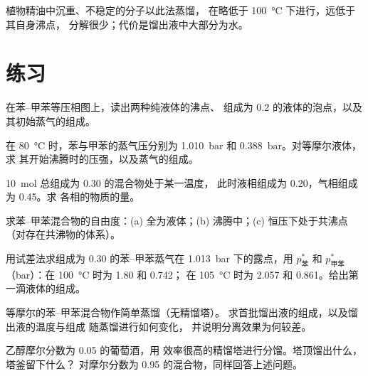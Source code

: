 植物精油中沉重、不稳定的分子以此法蒸馏，
在略低于 \qty{100}{\degreeCelsius} 下进行，远低于其自身沸点，
分解很少；代价是馏出液中大部分为水。

\section{练习}

\begin{exercise}[$\star$]\label{exo:b2:liquid-vapour-diagrams:1}
在苯–甲苯等压相图上，读出两种纯液体的沸点、
组成为 0.2 的液体的泡点，以及
其初始蒸气的组成。
\end{exercise}

\begin{exercise}[$\star$]\label{exo:b2:liquid-vapour-diagrams:2}
在 \qty{80}{\degreeCelsius} 时，苯与甲苯的蒸气压分别为
\qty{1.010}{bar} 和 \qty{0.388}{bar}。对等摩尔液体，求
其开始沸腾时的压强，以及蒸气的组成。
\end{exercise}

\begin{exercise}[$\star$]\label{exo:b2:liquid-vapour-diagrams:3}
\qty{10}{mol} 总组成为 0.30 的混合物处于某一温度，
此时液相组成为 0.20，气相组成为 0.45。求
各相的物质的量。
\end{exercise}

\begin{exercise}[$\star$]\label{exo:b2:liquid-vapour-diagrams:4}
求苯–甲苯混合物的自由度：(a) 全为液体；(b)
沸腾中；(c) 恒压下处于共沸点（对存在共沸物的体系）。
\end{exercise}

\begin{exercise}[$\star\star$]\label{exo:b2:liquid-vapour-diagrams:5}
用试差法求组成为 0.30 的苯–甲苯蒸气在
\qty{1.013}{bar} 下的露点，用 $p^*_{\text{苯}}$ 和 $p^*_{\text{甲苯}}$
（\unit{bar}）：在 \qty{100}{\degreeCelsius} 时为 1.80 和 0.742；
在 \qty{105}{\degreeCelsius} 时为 2.057 和 0.861。给出第一滴液体的组成。
\end{exercise}

\begin{exercise}[$\star\star$]\label{exo:b2:liquid-vapour-diagrams:6}
等摩尔的苯–甲苯混合物作简单蒸馏（无精馏塔）。
求首批馏出液的组成，以及馏出液的温度与组成
随蒸馏进行如何变化，
并说明分离效果为何较差。
\end{exercise}

\begin{exercise}[$\star\star$]\label{exo:b2:liquid-vapour-diagrams:7}
乙醇摩尔分数为 0.05 的葡萄酒，用
效率很高的精馏塔进行分馏。塔顶馏出什么，塔釜留下什么？
对摩尔分数为 0.95 的混合物，同样回答上述问题。
\end{exercise}

